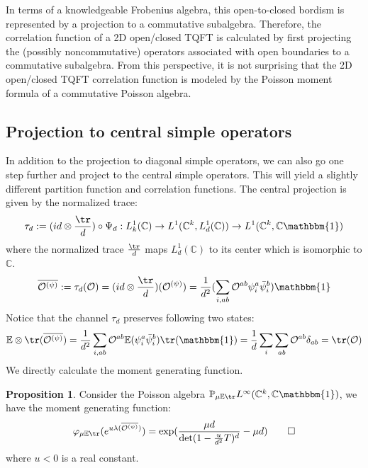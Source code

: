 \documentclass[a4paper,11pt]{article}
\theoremstyle{definition}
\numberwithin{equation}{section}
\newtheorem{proposition}{Proposition}[section]
\begin{document}
In terms of a knowledgeable Frobenius algebra, this open-to-closed bordism is represented by a projection to a commutative subalgebra. Therefore, the correlation function of a 2D open/closed TQFT is calculated by first projecting the (possibly noncommutative) operators associated with open boundaries to a commutative subalgebra. From this perspective, it is not surprising that the 2D open/closed TQFT correlation function is modeled by the Poisson moment formula of a commutative Poisson algebra.
\subsection{Projection to central simple operators}\label{subsection:centralsimple}

In addition to the projection to diagonal simple operators, we can also go one step further and project to the central simple operators. This will yield a slightly different partition function and correlation functions. The central projection is given by the normalized trace:
\begin{equation}
    \tau_d:=(id\otimes\frac{\tr}{d})\circ\Psi_d: L^1_k(\mathbb{C})\rightarrow L^1(\mathbb{C}^k, L^1_d(\mathbb{C})) \rightarrow L^1(\mathbb{C}^k, \mathbb{C}\mathbbm{1})
\end{equation}
where the normalized trace $\frac{\tr}{d}$ maps $L^1_d(\mathbb{C})$ to its center which is isomorphic to $\mathbb{C}$. 
\begin{equation}
    \overline{\mathcal{O}^{(\psi)}}:=\tau_d(\mathcal{O}) = (id\otimes\frac{\tr}{d})(\mathcal{O}^{(\psi)}) = \frac{1}{d^2}(\sum_{i,ab}\mathcal{O}^{ab}\psi^a_i\bar{\psi}^b_i)\mathbbm{1}
\end{equation}
Notice that the channel $\tau_d$ preserves following two states:
\begin{equation}
    \mathbb{E}\otimes\tr(\overline{\mathcal{O}^{(\psi)}}) = \frac{1}{d^2}\sum_{i,ab}\mathcal{O}^{ab}\mathbb{E}(\psi^a_i\bar{\psi}^b_i)\tr(\mathbbm{1}) = \frac{1}{d}\sum_i\sum_{ab}\mathcal{O}^{ab}\delta_{ab} = \tr(\mathcal{O})
\end{equation}
We directly calculate the moment generating function.
\begin{proposition}
    Consider the Poisson algebra $\mathbb{P}_{\mu\mathbb{E}\tr}L^\infty(\mathbb{C}^k, \mathbb{C}\mathbbm{1})$, we have the moment generating function:
    \begin{equation}
        \varphi_{\mu\mathbb{E}\tr}(e^{u\lambda(\overline{\mathcal{O}^{(\psi)}})}) = \exp(\frac{\mu d}{\det(1 - \frac{u}{d^2}T)^d} - \mu d)\qedhere
    \end{equation}
    where $u < 0$ is a real constant. 
\end{proposition}
\end{document}
